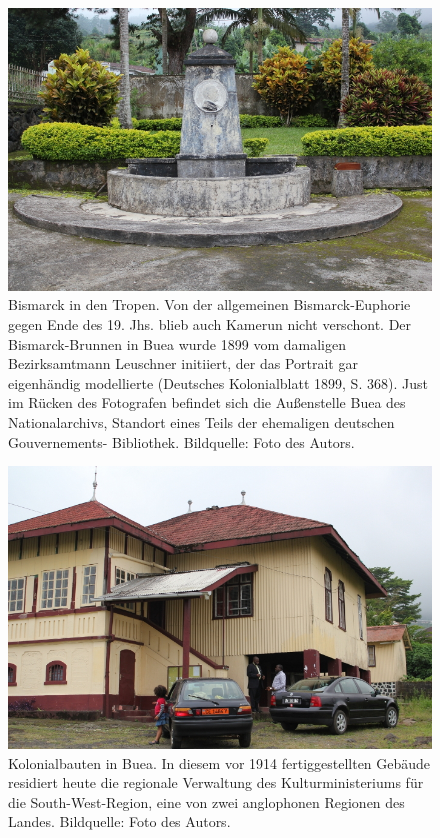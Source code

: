 \documentclass[a4paper,
fontsize=11pt,
oneside,
numbers=noperiodatend,
parskip=half-,
bibliography=totoc,
final
]{scrartcl}
\begin{document}
\begin{figure}[htbp]
\centering
\includegraphics{img/Bismarckbrunnen.jpg}
\caption{Bismarck in den Tropen. Von der allgemeinen Bismarck-Euphorie
gegen Ende des 19. Jhs. blieb auch Kamerun nicht verschont. Der
Bismarck-Brunnen in Buea wurde 1899 vom damaligen Bezirksamtmann
Leuschner initiiert, der das Portrait gar eigenhändig modellierte
(Deutsches Kolonialblatt 1899, S. 368). Just im Rücken des Fotografen
befindet sich die Außenstelle Buea des Nationalarchivs, Standort eines
Teils der ehemaligen deutschen Gouvernements- Bibliothek. Bildquelle:
Foto des Autors.}
\end{figure}

\begin{figure}[htbp]
\centering
\includegraphics{img/MINACBuea.jpg}
\caption{Kolonialbauten in Buea. In diesem vor 1914 fertiggestellten
Gebäude residiert heute die regionale Verwaltung des Kulturministeriums
für die South-West-Region, eine von zwei anglophonen Regionen des
Landes. Bildquelle: Foto des Autors.}
\end{figure}
\end{document}
